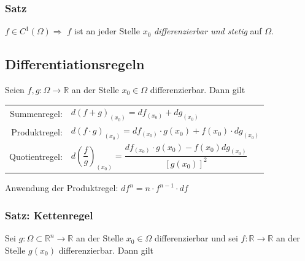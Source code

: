 \documentclass[a4paper, fontsize = 8pt, landscape]{scrartcl}
\newcommand{\R}[0]{\mathbb{R}}
\begin{document}
\begin{multicols*}{3}
    \subsubsection{Satz}

    $f \in C^1(\Omega) \Rightarrow$ $f$ ist an jeder Stelle $x_0$ \emph{differenzierbar und stetig} auf $\Omega$.




    \subsection{Differentiationsregeln}

    Seien $f,g: \Omega \to \R$ an der Stelle $x_0 \in \Omega$ differenzierbar. Dann gilt

    \begin{center}
        \renewcommand{\arraystretch}{2}
        \begin{tabular}{r l} \toprule
            Summenregel:   & \hspace*{-10pt} $d(f + g)_{(x_0)} = df_{(x_0)} + dg_{(x_0)}$                                                           \\
            Produktregel:  & \hspace*{-10pt} $d(f \cdot g)_{(x_0)} = df_{(x_0)} \cdot g(x_0) + f(x_0) \cdot dg_{(x_0)}$                             \\
            Quotientregel: & \hspace*{-10pt} $d\left(\dfrac{f}{g}\right)_{(x_0)} = \dfrac{df_{(x_0)} \cdot g(x_0) - f(x_0) dg_{(x_0)}}{[g(x_0)]^2}$ \\ \bottomrule
        \end{tabular}
    \end{center}

    Anwendung der Produktregel: $d f^n = n \cdot f^{n - 1} \cdot df$


    \subsubsection{Satz: Kettenregel}

    Sei $g: \Omega \subset \R^n \to \R$ an der Stelle $x_0 \in \Omega$ differenzierbar und sei $f: \R \to \R$ an der Stelle $g(x_0)$ differenzierbar. Dann gilt


\end{multicols*}
\end{document}
